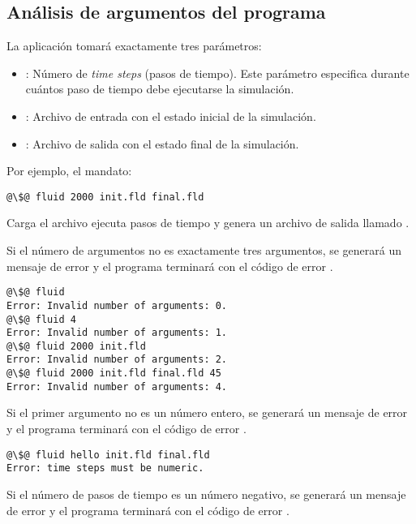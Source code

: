 \subsection{Análisis de argumentos del programa}

La aplicación tomará exactamente tres parámetros:

\begin{itemize}
\item {}: 
Número de \emph{time steps} (pasos de tiempo). Este parámetro especifica
durante cuántos paso de tiempo debe ejecutarse la simulación.
\item {}: 
Archivo de entrada con el estado inicial de la simulación.
\item {}: 
Archivo de salida con el estado final de la simulación.
\end{itemize}

Por ejemplo, el mandato:

\begin{lstlisting}[style=terminal,escapechar=@]
@\$@ fluid 2000 init.fld final.fld
\end{lstlisting}

Carga el archivo  ejecuta  pasos de tiempo y genera
un archivo de salida llamado .

Si el número de argumentos no es exactamente tres argumentos, 
se generará un mensaje de error y el programa terminará con el código de error 
.

\begin{lstlisting}[style=terminal,escapechar=@]
@\$@ fluid 
Error: Invalid number of arguments: 0.
@\$@ fluid 4
Error: Invalid number of arguments: 1.
@\$@ fluid 2000 init.fld
Error: Invalid number of arguments: 2.
@\$@ fluid 2000 init.fld final.fld 45
Error: Invalid number of arguments: 4.
\end{lstlisting}

Si el primer argumento no es un número entero,
se generará un mensaje de error y el programa terminará con el código de error 
.

\begin{lstlisting}[style=terminal,escapechar=@]
@\$@ fluid hello init.fld final.fld
Error: time steps must be numeric.
\end{lstlisting}

Si el número de pasos de tiempo es un número negativo,
se generará un mensaje de error y el programa terminará con el código de error 
.

